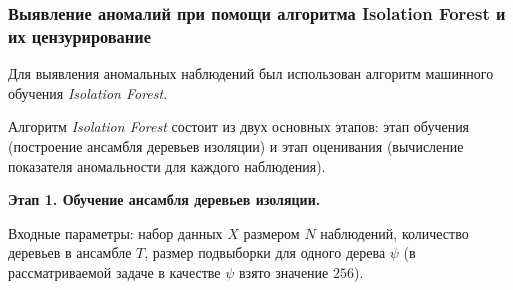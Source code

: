 \documentclass[14pt,a4paper]{extarticle}
\begin{document}
\subsubsection{Выявление аномалий при помощи алгоритма Isolation Forest и их цензурирование}

Для выявления аномальных наблюдений был использован алгоритм машинного обучения \textit{Isolation Forest}.

Алгоритм \textit{Isolation Forest} состоит из двух основных этапов: этап обучения 
(построение ансамбля деревьев изоляции) и этап оценивания (вычисление показателя аномальности для 
каждого наблюдения).

\textbf{Этап 1. Обучение ансамбля деревьев изоляции.}

Входные параметры: набор данных $X$ размером $N$ наблюдений, количество деревьев в ансамбле $T$, размер 
подвыборки для одного дерева $\psi$ (в рассматриваемой задаче в качестве $\psi$ взято значение $256$).
\end{document}
